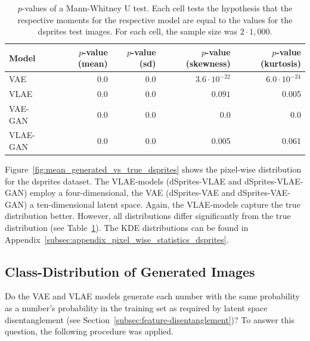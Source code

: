 \begin{table}
    \begin{tabular}{lrrrr}
        \toprule
        Model              & $p$-value (mean) & $p$-value (sd) & $p$-value (skewness) & $p$-value (kurtosis) \\
        \midrule
        \ac{VAE}           & $0.0$            & 0.0            & $3.6\cdot 10^{-22}$  & $6.0\cdot 10^{-24}$  \\
        \ac{VLAE}          & 0.0              & $0.0$          & $0.091$              & 0.005                \\
        \ac{VAE}-\ac{GAN}  & 0.0              & 0.0            & 0.0                  & 0.0                  \\
        \ac{VLAE}-\ac{GAN} & 0.0              & $0.0$          & 0.005                & 0.061                \\
        \bottomrule
    \end{tabular}
    \caption[Models on dSprites - $p$-values for Distributions]{$p$-values of a Mann-Whitney U test. Each cell tests the hypothesis that the respective moments for the respective model are equal to the values for the dsprites test images. For each cell, the sample size was $2\cdot 1,000$.}
    \label{tab:vae-vlae-dsprites}
\end{table}

Figure~\ref{fig:mean_generated_vs_true_dsprites} shows the pixel-wise distribution for the dsprites dataset.
The \ac{VLAE}-models (dSprites-\ac{VLAE} and dSprites-\ac{VLAE}-\ac{GAN}) employ a four-dimensional, the \ac{VAE} (dSprites-\ac{VAE} and dSprites-\ac{VAE}-\ac{GAN}) a ten-dimensional latent space.
Again, the \ac{VLAE}-models capture the true distribution better.
However, all distributions differ significantly from the true distribution (see Table~\ref{tab:vae-vlae-dsprites}).
The \ac{KDE} distributions can be found in Appendix~\ref{subsec:appendix_pixel_wise_statistics_dsprites}.

\subsection{Class-Distribution of Generated Images}\label{subsec:class-distribution-of-generated-images}

Do the \ac{VAE} and \ac{VLAE} models generate each number with the same probability as a number's probability in the training set as required by latent space disentanglement (see Section~\ref{subsec:feature-disentanglement})?
To answer this question, the following procedure was applied.

